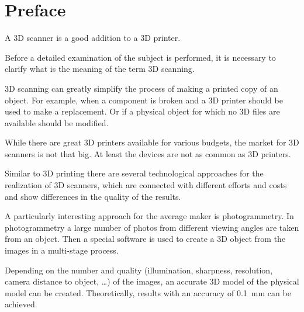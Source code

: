 \chapter{Preface}%
\label{c:preface}%
A 3D scanner is a good addition to a 3D printer.%

Before a detailed examination of the subject is performed, it is necessary to clarify what is the meaning of the term 3D scanning.%

%

3D scanning can greatly simplify the process of making a printed copy of an object. For example, when a component is broken and a 3D printer should be used to make a replacement. Or if a physical object for which no 3D files are available should be modified.%

While there are great 3D printers available for various budgets, the market for 3D scanners is not that big. At least the devices are not as common as 3D printers.%

Similar to 3D printing there are several technological approaches for the realization of 3D scanners, which are connected with different efforts and costs and show differences in the quality of the results.%

A particularly interesting approach for the average maker is photogrammetry. In photogrammetry a large number of photos from different viewing angles are taken from an object. Then a special software is used to create a 3D object from the images in a multi-stage process.%

Depending on the number and quality (illumination, sharpness, resolution, camera distance to object, \dots) of the images, an accurate 3D model of the physical model can be created. Theoretically, results with an accuracy of \SI{0.1}{\milli\meter} can be achieved.%


